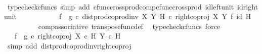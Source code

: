 \begin{isabellebody}
\ \ \ \ \ \ \ \ \isamarkupfalse%
\ {\isacharparenleft}{\kern0pt}typecheck{\isacharunderscore}{\kern0pt}cfuncs{\isacharcomma}{\kern0pt}\ simp\ add{\isacharcolon}{\kern0pt}\ cfunc{\isacharunderscore}{\kern0pt}cross{\isacharunderscore}{\kern0pt}prod{\isacharunderscore}{\kern0pt}comp{\isacharunderscore}{\kern0pt}cfunc{\isacharunderscore}{\kern0pt}cross{\isacharunderscore}{\kern0pt}prod\ id{\isacharunderscore}{\kern0pt}left{\isacharunderscore}{\kern0pt}unit{}\ id{\isacharunderscore}{\kern0pt}right{\isacharunderscore}{\kern0pt}unit{}{\isacharparenright}{\kern0pt}\isanewline
\ \ \ \ \ \ \isamarkupfalse%
\ \isamarkupfalse%
\ {\isachardoublequoteopen}{\isachardot}{\kern0pt}{\isachardot}{\kern0pt}{\isachardot}{\kern0pt}\ {\isacharequal}{\kern0pt}\ {\isacharparenleft}{\kern0pt}f\isactrlsup {\isasymflat}\ {\isasymamalg}\ g\isactrlsup {\isasymflat}\ {\isasymcirc}\isactrlsub c\ {\isacharparenleft}{\kern0pt}dist{\isacharunderscore}{\kern0pt}prod{\isacharunderscore}{\kern0pt}coprod{\isacharunderscore}{\kern0pt}inv{}\ X\ Y\ H\ {\isasymcirc}\isactrlsub c\ right{\isacharunderscore}{\kern0pt}coproj\ X\ Y\ {\isasymtimes}\isactrlsub f\ id\ H{\isacharparenright}{\kern0pt}{\isacharparenright}{\kern0pt}\isactrlsup {\isasymsharp}{\isachardoublequoteclose}\isanewline
\ \ \ \ \ \ \ \ \isamarkupfalse%
\ comp{\isacharunderscore}{\kern0pt}associative{}\ transpose{\isacharunderscore}{\kern0pt}func{\isacharunderscore}{\kern0pt}def\ \isamarkupfalse%
\ {\isacharparenleft}{\kern0pt}typecheck{\isacharunderscore}{\kern0pt}cfuncs{\isacharcomma}{\kern0pt}\ force{\isacharparenright}{\kern0pt}\isanewline
\ \ \ \ \ \ \isamarkupfalse%
\ \isamarkupfalse%
\ {\isachardoublequoteopen}{\isachardot}{\kern0pt}{\isachardot}{\kern0pt}{\isachardot}{\kern0pt}\ {\isacharequal}{\kern0pt}\ {\isacharparenleft}{\kern0pt}f\isactrlsup {\isasymflat}\ {\isasymamalg}\ g\isactrlsup {\isasymflat}\ {\isasymcirc}\isactrlsub c\ right{\isacharunderscore}{\kern0pt}coproj\ {\isacharparenleft}{\kern0pt}X\ {\isasymtimes}\isactrlsub c\ H{\isacharparenright}{\kern0pt}\ {\isacharparenleft}{\kern0pt}Y\ {\isasymtimes}\isactrlsub c\ H{\isacharparenright}{\kern0pt}{\isacharparenright}{\kern0pt}\isactrlsup {\isasymsharp}{\isachardoublequoteclose}\isanewline
\ \ \ \ \ \ \ \ \isamarkupfalse%
\ {\isacharparenleft}{\kern0pt}simp\ add{\isacharcolon}{\kern0pt}\ dist{\isacharunderscore}{\kern0pt}prod{\isacharunderscore}{\kern0pt}coprod{\isacharunderscore}{\kern0pt}inv{}{\isacharunderscore}{\kern0pt}right{\isacharunderscore}{\kern0pt}coproj{\isacharparenright}{\kern0pt}\isanewline

\end{isabellebody}
